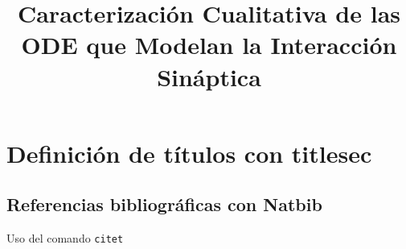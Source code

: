\documentclass{article} %
\title{Caracterización Cualitativa de las ODE que Modelan la Interacción Sináptica}
\begin{document}
\maketitle
\section{Definición de títulos con titlesec}
\lipsum[3]

\subsection{Referencias bibliográficas con Natbib}

Uso del comando \texttt{citet}
\end{document}
